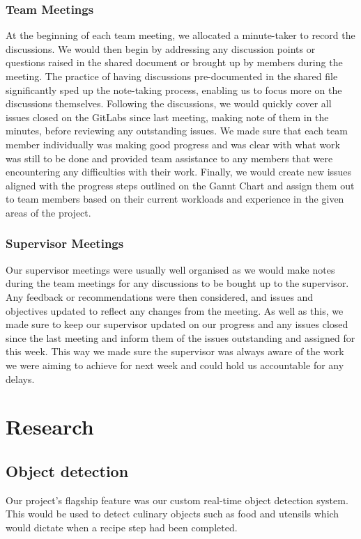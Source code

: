 \documentclass{article}
\begin{document}
\subsubsection{Team Meetings}
At the beginning of each team meeting, we allocated a minute-taker to record the discussions. We would then begin by addressing any discussion points or questions raised in the shared document or brought up by members during the meeting. The practice of having discussions pre-documented in the shared file significantly sped up the note-taking process, enabling us to focus more on the discussions themselves.
Following the discussions, we would quickly cover all issues closed on the GitLabs since last meeting, making note of them in the minutes, before reviewing any outstanding issues. We made sure that each team member individually was making good progress and was clear with what work was still to be done and provided team assistance to any members that were encountering any difficulties with their work.
Finally, we would create new issues aligned with the progress steps outlined on the Gannt Chart and assign them out to team members based on their current workloads and experience in the given areas of the project.
\subsubsection{Supervisor Meetings}
Our supervisor meetings were usually well organised as we would make notes during the team meetings for any discussions to be bought up to the supervisor. Any feedback or recommendations were then considered, and issues and objectives updated to reflect any changes from the meeting.
As well as this, we made sure to keep our supervisor updated on our progress and any issues closed since the last meeting and inform them of the issues outstanding and assigned for this week. This way we made sure the supervisor was always aware of the work we were aiming to achieve for next week and could hold us accountable for any delays.


\section{Research}
\subsection{Object detection}
Our project's flagship feature was our custom real-time object detection system. This would be used to detect culinary objects such as food and utensils which would dictate when a recipe step had been completed.
\end{document}
